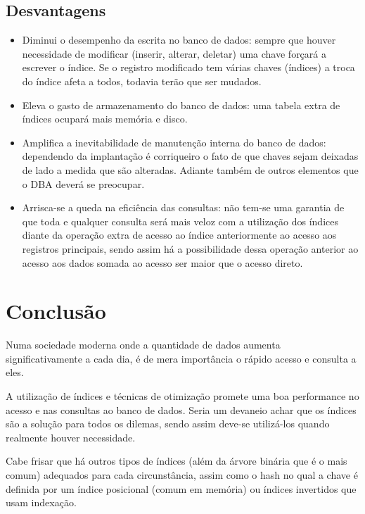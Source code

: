 \documentclass[12pt,a4paper]{article}
\begin{document}
\subsection{Desvantagens}

\begin{itemize}
	\item Diminui o desempenho da escrita no banco de dados: sempre que houver necessidade de modificar (inserir, alterar, deletar) uma chave forçará a escrever o índice. Se o registro modificado tem várias chaves (índices) a troca do índice afeta a todos, todavia terão que ser mudados.
	
	\item Eleva o gasto de armazenamento do banco de dados: uma tabela extra de índices ocupará mais memória e disco.
	
	\item Amplifica a inevitabilidade de manutenção interna do banco de dados: dependendo da implantação é corriqueiro o fato de que chaves sejam deixadas de lado a medida que são alteradas. Adiante também de outros elementos que o DBA deverá se preocupar.
	
	\item	Arrisca-se a queda na eficiência das consultas: não tem-se uma garantia de que toda e qualquer consulta será mais veloz com a utilização dos índices diante da operação extra de acesso ao índice anteriormente ao acesso aos registros principais, sendo assim há a possibilidade dessa operação anterior ao acesso aos dados somada ao acesso ser maior que o acesso direto.
	
\end{itemize}

\section{Conclusão}

Numa sociedade moderna onde a quantidade de dados aumenta significativamente a cada dia, é de mera importância o rápido acesso e consulta a eles.

A utilização de índices e técnicas de otimização promete uma boa performance no acesso e nas consultas ao banco de dados. Seria um devaneio achar que os índices são a solução para todos os dilemas, sendo assim deve-se utilizá-los quando realmente houver necessidade.

Cabe frisar que há outros tipos de índices (além da árvore binária que é o mais comum) adequados para cada circunstância, assim como o hash no qual a chave é definida por um índice posicional (comum em memória) ou índices invertidos que usam indexação.
\end{document}
